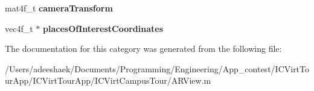 \begin{DoxyCompactItemize}
\item 
\hypertarget{category_a_r_view_07_08_aea054284344eec85395c4d0260c18f30}{mat4f\-\_\-t {\bfseries camera\-Transform}}\label{category_a_r_view_07_08_aea054284344eec85395c4d0260c18f30}

\item 
\hypertarget{category_a_r_view_07_08_a94bd547ae6aaf4683c662863e2e35a1d}{vec4f\-\_\-t $\ast$ {\bfseries places\-Of\-Interest\-Coordinates}}\label{category_a_r_view_07_08_a94bd547ae6aaf4683c662863e2e35a1d}

\end{DoxyCompactItemize}


The documentation for this category was generated from the following file\-:\begin{DoxyCompactItemize}
\item 
/\-Users/adeeshaek/\-Documents/\-Programming/\-Engineering/\-App\-\_\-contest/\-I\-C\-Virt\-Tour\-App/\-I\-C\-Virt\-Tour\-App/\-I\-C\-Virt\-Campus\-Tour/A\-R\-View.\-m\end{DoxyCompactItemize}
